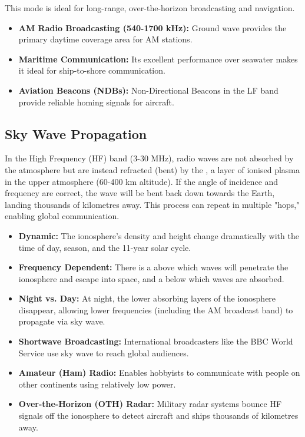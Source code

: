 This mode is ideal for long-range, over-the-horizon broadcasting and navigation.
\begin{itemize}
    \item \textbf{AM Radio Broadcasting (540-1700 kHz):} Ground wave provides the primary daytime coverage area for AM stations.
    \item \textbf{Maritime Communication:} Its excellent performance over seawater makes it ideal for ship-to-shore communication.
    \item \textbf{Aviation Beacons (NDBs):} Non-Directional Beacons in the LF band provide reliable homing signals for aircraft.
\end{itemize}


\subsection{Sky Wave Propagation}

In the High Frequency (HF) band (3-30 MHz), radio waves are not absorbed by the atmosphere but are instead refracted (bent) by the , a layer of ionised plasma in the upper atmosphere (60-400 km altitude). If the angle of incidence and frequency are correct, the wave will be bent back down towards the Earth, landing thousands of kilometres away. This process can repeat in multiple "hops," enabling global communication.

\begin{itemize}
    \item \textbf{Dynamic:} The ionosphere's density and height change dramatically with the time of day, season, and the 11-year solar cycle.
    \item \textbf{Frequency Dependent:} There is a  above which waves will penetrate the ionosphere and escape into space, and a  below which waves are absorbed.
    \item \textbf{Night vs. Day:} At night, the lower absorbing layers of the ionosphere disappear, allowing lower frequencies (including the AM broadcast band) to propagate via sky wave.
\end{itemize}

\begin{itemize}
    \item \textbf{Shortwave Broadcasting:} International broadcasters like the BBC World Service use sky wave to reach global audiences.
    \item \textbf{Amateur (Ham) Radio:} Enables hobbyists to communicate with people on other continents using relatively low power.
    \item \textbf{Over-the-Horizon (OTH) Radar:} Military radar systems bounce HF signals off the ionosphere to detect aircraft and ships thousands of kilometres away.
\end{itemize}


